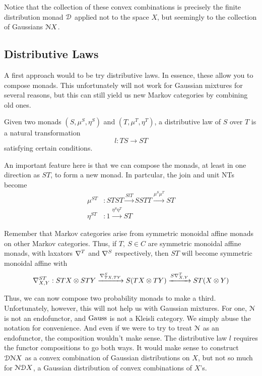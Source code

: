 Notice that the collection of these convex combinations is precisely the finite distribution monad $\mathcal{D}$ applied not to the space $X$, but seemingly to the collection of Gaussians $\mathcal{N} X$.

\subsection{Distributive Laws}

A first approach would to be try distributive laws.
In essence, these allow you to compose monads.
This unfortunately will not work for Gaussian mixtures for several reasons, but this can still yield us new Markov categories by combining old ones.

Given two monads $(S,\mu^S, \eta^S)$ and $(T, \mu^T,\eta^T)$, a distributive law of $S$ over $T$ is a natural transformation
\begin{equation}
    l:TS\rightarrow ST
\end{equation}
satisfying certain conditions. 

An important feature here is that we can compose the monads, at least in one direction as $ST$, to form a new monad.
In partcular, the join and unit NTs become
\begin{align}
    \mu^{ST} &: STST \xrightarrow{SlT} SSTT \xrightarrow{\mu^S \mu^T} ST\\
    \eta^{ST} &: 1\xrightarrow{\eta^S\eta^T}ST
\end{align}

Remember that Markov categories arise from symmetric monoidal affine monads on other Markov categories.
Thus, if $T,\ S\in C$ are symmetric monoidal affine monads, with laxators $\nabla^T$ and $\nabla^S$ respectively, then $ST$ will become symmetric monoidal affine with
\begin{equation}
    \nabla^{ST}_{X,Y} : STX \otimes STY \xrightarrow{\nabla^S_{TX,TY}}
    S(TX\otimes TY) \xrightarrow{S\nabla^T_{X,Y}} ST(X\otimes Y)
\end{equation}

Thus, we can now compose two probability monads to make a third.
Unfortunately, however, this will not help us with Gaussian mixtures.
For one, $\mathcal{N}$ is not an endofunctor, and $\mathrm{Gauss}$ is not a Kleisli category.
We simply abuse the notation for convenience.
And even if we were to try to treat $\mathcal{N}$ as an endofunctor, the composition wouldn't make sense.
The distributive law $l$ requires the functor compositions to go both ways. 
It would make sense to construct $\mathcal{D}\mathcal{N} X$ as a convex combination of Gaussian distributions on $X$, but not so much for $\mathcal{N} \mathcal{D} X$, a Gaussian distribution of convex combinations of $X$'s.

